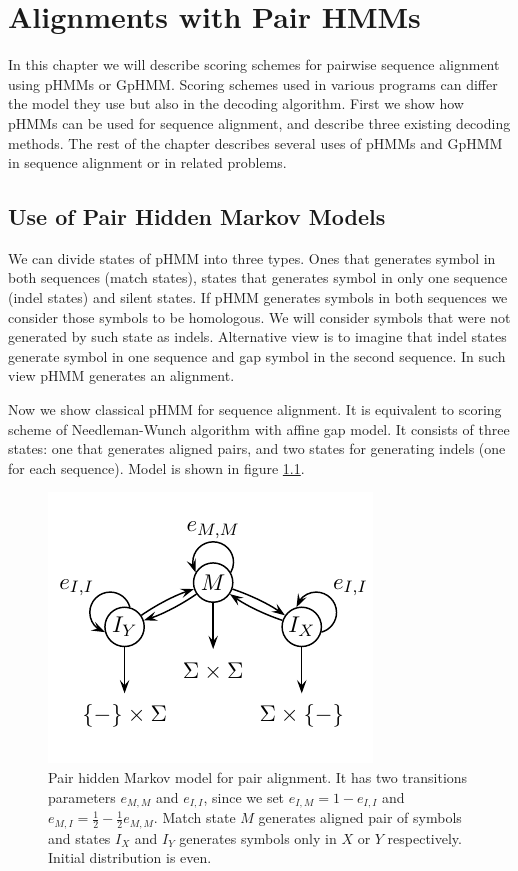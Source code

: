 \chapter{Alignments with Pair HMMs}\label{CHAPTER:PAIRHMM}

In this chapter we will describe scoring schemes for pairwise sequence alignment
using pHMMs or GpHMM. Scoring schemes used in various programs can differ the
model they use but also in the decoding algorithm. First we show how pHMMs can
be used for sequence alignment, and describe three existing  decoding methods.
The rest of the chapter describes several uses of pHMMs and GpHMM in sequence
alignment or in related problems.

\section{Use of Pair Hidden Markov Models}\label{SECTION:SIMPLEPHMM}

We can divide states of pHMM into three types.  Ones that generates symbol in
both sequences (match states), states that generates symbol in only one sequence
(indel states) and silent
states. If pHMM generates  symbols in both sequences we consider those symbols
to be homologous. We will consider symbols that were not generated by such state
as indels. Alternative view is to imagine that indel states generate symbol in
one sequence and gap symbol in the second sequence. In such view pHMM generates
an alignment.

Now we show classical pHMM for sequence alignment. It is equivalent to scoring
scheme of Needleman-Wunch algorithm with affine gap model. It consists of three
states: one that generates aligned pairs, and two states for generating
indels (one for each sequence). Model is shown in figure \ref{FIGURE:SIMPLEPHMM}. 

\begin{figure}
\begin{center}
\includegraphics{../figures/pairHMM.pdf}
\end{center}
\caption[Simple pair HMM model for alignment]{Pair hidden Markov model for pair alignment. It has two transitions
parameters $e_{M,M}$ and $e_{I,I}$, since we set $e_{I,M} = 1 - e_{I,I}$ and
$e_{M,I}=\frac12-\frac12e_{M,M}$. Match state $M$ generates aligned pair of symbols
and states $I_X$ and $I_Y$ generates symbols only in $X$ or $Y$ respectively.
Initial distribution is even.
}\label{FIGURE:SIMPLEPHMM}
\end{figure}

